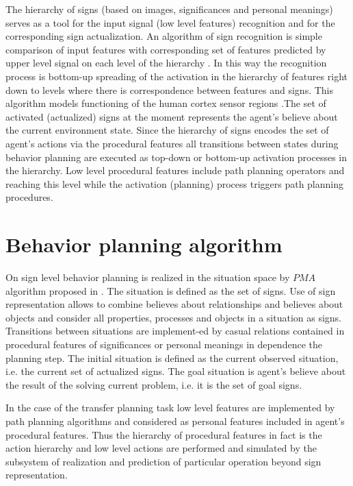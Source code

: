 \documentclass[runningheads,a4paper]{llncs}
\begin{document}
The hierarchy of signs (based on images, significances and personal meanings) serves as a tool for the input signal (low level features) recognition and for the corresponding sign actualization. An algorithm of sign recognition is simple comparison of input features with corresponding set of features predicted by upper level signal on each level of the hierarchy \cite{Osipov2014}. In this way the recognition process is bottom-up spreading of the activation in the hierarchy of features right down to levels where there is correspondence between features and signs. This algorithm models functioning of the human cortex sensor regions \cite{Mountcastle1998,George2009}.The set of activated (actualized) signs at the moment represents the agent's believe about the current environment state. Since the hierarchy of signs encodes the set of agent's actions via the procedural features all transitions between states during behavior planning are executed as top-down or bottom-up activation processes in the hierarchy. Low level procedural features include path planning operators and reaching this level while the activation (planning) process triggers path planning procedures.

\section{Behavior planning algorithm}\label{behavior}

On sign level behavior planning is realized in the situation space by $PMA$ algorithm proposed in \cite{Osipov2015}. The situation is defined as the set of signs. Use of sign representation allows to combine believes about relationships and believes about objects and consider all properties, processes and objects in a situation as signs. Transitions between situations are implement-ed by casual relations contained in procedural features of significances or personal meanings in dependence the planning step. The initial situation is defined as the current observed situation, i.e. the current set of actualized signs. The goal situation is agent's believe about the result of the solving current problem, i.e. it is the set of goal signs.

In the case of the transfer planning task low level features are implemented by path planning algorithms and considered as personal features included in agent's procedural features. Thus the hierarchy of procedural features in fact is the action hierarchy and low level actions are performed and simulated by the subsystem of realization and prediction of particular operation beyond sign representation.
\end{document}
